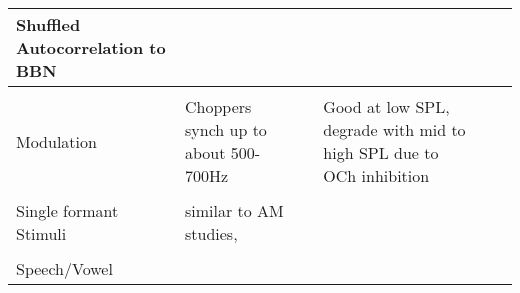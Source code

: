 \begin{longtable}{XXXXXX}
\\\hline
                    Shuffled Autocorrelation to BBN                     &                       \citep{LouageJorisEtAl:2004}                       & & 
                                                                        &                                                                          & 

\\\hline
                                                                        &                                                                          & & & & \\\hline
                              Modulation                                & Choppers synch up to about 500-
700Hz
\citep{BlackburnSachs:1989,Bourk:1976,FrisinaKarcichEtAl:1996,FrisinaSmithEtAl:1990,FrisinaSmithEtAl:1990a;FrisinaWaltonEtAl:1993,RhodeGreenberg:1994a,WangSachs:1994;WinterPalmer:1990}
                                                                        &                                                                          & Good at low SPL, degrade with mid to high SPL due to OCh inhibition
\citep{JorisSmith:1998}
                                                                        &                                                                          & \citep{Evans:1978,Javel:1980,PalmerEvans:1982}\\\hline
                                                                        &                                                                          & & & & 
\\\hline
                        Single formant Stimuli                          & \citep{Rhode:1998} similar to AM
                    studies,\citep{WangSachs:1994}                      &                                                                          & & & \citep{WangSachs:1993}\\\hline
                                                                        &                                                                          & & 
                                                                        &                                                                          & \\\hline
                             Speech/Vowel                               &                                                                          & & & & 
\citep{Geisler:1988,KiangMoxon:1974,SachsWinslowEtAl:1988,SachsYoung:1979,YoungSachs:1979}\\\hline

\end{longtable}
